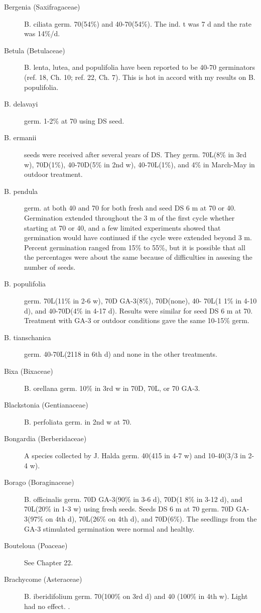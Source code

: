 \begin{description}
\item[Bergenia (Saxifragaceae)] B. ciliata germ. 70(54\%) and 40-70(54\%). The
ind. t was 7 d and the rate was 14\%/d.

\item[Betula (Betulaceae)] B. lenta, lutea, and populifolia have been reported to
be 40-70 germinators (ref. 18, Ch. 10; ref. 22, Ch. 7). This is hot in accord with my
results on B. populifolia.
\item[B. delavayi] germ. 1-2\% at 70 using DS seed.
\item[B. ermanii] seeds were received after several years of DS. They germ. 70L(8\%
in 3rd w), 70D(1\%), 40-70D(5\% in 2nd w), 40-70L(1\%), and 4\% in March-May in
outdoor treatment.
\item[B. pendula] germ. at both 40 and 70 for both fresh and seed DS 6 m at 70 or 40.
Germination extended throughout the 3 m of the first cycle whether starting at 70 or 40,
and a few limited experiments showed that germination would have continued if the
cycle were extended beyond 3 m. Percent germination ranged from 15\% to 55\%, but it
is possible that all the percentages were about the same because of difficulties in
assesing the number of seeds.
\item[B. populifolia] germ. 70L(11\% in 2-6 w), 70D GA-3(8\%), 70D(none), 40-
70L(1 1\% in 4-10 d), and 40-70D(4\% in 4-17 d). Results were similar for seed DS 6 m
at 70. Treatment with GA-3 or outdoor conditions gave the same 10-15\% germ.
\item[B. tianschanica] germ. 40-70L(2118 in 6th d) and none in the other treatments.
\item[Bixa (Bixaceae)] B. orellana germ. 10\% in 3rd w in 70D, 70L, or 70 GA-3.
\item[Blackstonia (Gentianaceae)] B. perfoliata germ. in 2nd w at 70.
\item[Bongardia (Berberidaceae)] A species collected by J. Halda germ. 40(415
in 4-7 w) and 10-40(3/3 in 2-4 w).
\item[Borago (Boraginaceae)] B. officinalis germ. 70D GA-3(90\% in 3-6 d),
70D(1 8\% in 3-12 d), and 70L(20\% in 1-3 w) using fresh seeds. Seeds DS 6 m at 70
germ. 70D GA-3(97\% on 4th d), 70L(26\% on 4th d), and 70D(6\%). The seedlings from
the GA-3 stimulated germination were normal and healthy.
\item[Bouteloua (Poaceae)] See Chapter 22.
\item[Brachycome (Asteraceae)] B. iberidifolium germ. 70(100\% on 3rd d) and
40 (100\% in 4th w). Light had no effect. .

\end{description}
